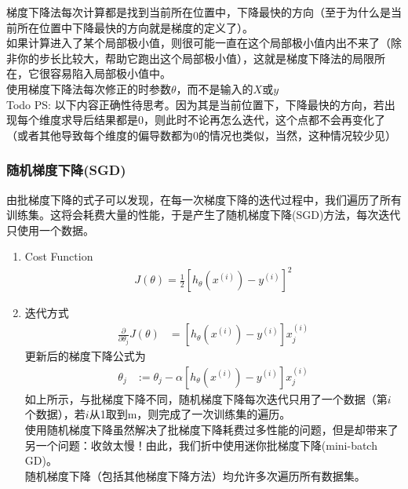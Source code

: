 \begin{enumerate}
	梯度下降法每次计算都是找到当前所在位置中，下降最快的方向（至于为什么是当前所在位置中下降最快的方向就是梯度的定义了）。 \\
	如果计算进入了某个局部极小值，则很可能一直在这个局部极小值内出不来了（除非你的步长比较大，帮助它跑出这个局部极小值），这就是梯度下降法的局限所在，它很容易陷入局部极小值中。 \\
	使用梯度下降法每次修正的时参数$\theta$，而不是输入的$X$或$y$ \\

	Todo PS: 以下内容正确性待思考。因为其是当前位置下，下降最快的方向，若出现每个维度求导后结果都是0，则此时不论再怎么迭代，这个点都不会再变化了（或者其他导致每个维度的偏导数都为0的情况也类似，当然，这种情况较少见）
\end{enumerate}


\subsubsection{随机梯度下降(SGD)}
由批梯度下降的式子可以发现，在每一次梯度下降的迭代过程中，我们遍历了所有训练集。这将会耗费大量的性能，于是产生了随机梯度下降(SGD)方法，每次迭代只使用一个数据。 \\
\begin{enumerate}
	\item Cost Function
	\begin{equation}\begin{aligned}
		J(\theta) = \frac{1}{2} \left[h_{\theta} {(x^{(i)})} - y^{(i)}\right]^2
	\end{aligned}\end{equation}

	\item 迭代方式
	\begin{equation}\begin{aligned}
	      \frac{\partial} {\partial \theta_j} J(\theta) &= \left[ h_\theta(x^{(i)}) - y^{(i)} \right]x_j^{(i)}
	\end{aligned}\end{equation}
	更新后的梯度下降公式为
	\begin{equation}\begin{aligned}
		\theta_j &:= \theta_j - \alpha\left[ h_\theta(x^{(i)}) - y^{(i)} \right]x_j^{(i)}
	\end{aligned}\end{equation}
	如上所示，与批梯度下降不同，随机梯度下降每次迭代只用了一个数据（第$i$个数据），若$i$从1取到m，则完成了一次训练集的遍历。\\
	使用随机梯度下降虽然解决了批梯度下降耗费过多性能的问题，但是却带来了另一个问题：收敛太慢！由此，我们折中使用迷你批梯度下降(mini-batch GD)。\\
	随机梯度下降（包括其他梯度下降方法）均允许多次遍历所有数据集。
\end{enumerate}

